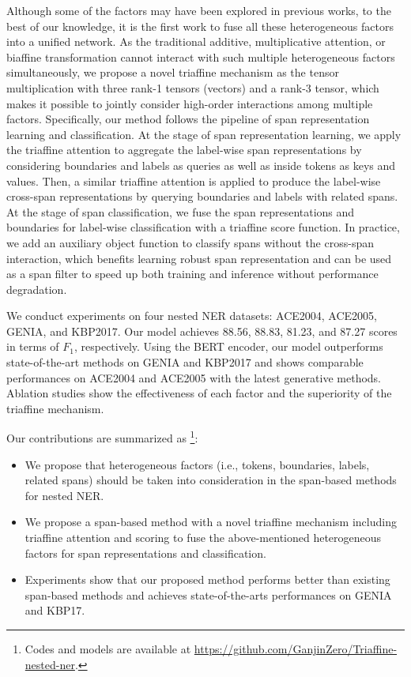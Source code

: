 \documentclass[11pt]{article}
\begin{document}
Although some of the factors may have been explored in previous works, to the best of our knowledge, it is the first work to fuse all these heterogeneous factors into a unified network. As the traditional additive, multiplicative attention, or biaffine transformation cannot interact with such multiple heterogeneous factors simultaneously, we propose a novel triaffine mechanism as the tensor multiplication with three rank-1 tensors (vectors) and a rank-3 tensor, which makes it possible to jointly consider high-order interactions among multiple factors. Specifically, our method follows the pipeline of span representation learning and classification. At the stage of span representation learning, we apply the triaffine attention to aggregate the label-wise span representations by considering boundaries and labels as queries as well as inside tokens as keys and values. Then, a similar triaffine attention is applied to produce the label-wise cross-span representations by querying boundaries and labels with related spans. At the stage of span classification, we fuse the span representations and boundaries for label-wise classification with a triaffine score function. 
In practice, we add an auxiliary object function to classify spans without the cross-span interaction, which benefits learning robust span representation and can be used as a span filter to speed up both training and inference without performance degradation.

We conduct experiments on four nested NER datasets: ACE2004, ACE2005, GENIA, and KBP2017. 
Our model achieves 88.56, 88.83, 81.23, and 87.27 scores in terms of $F_1$, respectively.
Using the BERT encoder, our model outperforms state-of-the-art methods on GENIA and KBP2017 and shows comparable performances on ACE2004 and ACE2005 with the latest generative methods.
Ablation studies show the effectiveness of each factor and the superiority of the triaffine mechanism. 


Our contributions are summarized as \footnote{Codes and models are available at \url{https://github.com/GanjinZero/Triaffine-nested-ner}.}:
\begin{itemize}
    \item We propose that heterogeneous factors (i.e., tokens, boundaries, labels, related spans) should be taken into consideration in the span-based methods for nested NER.
    \item We propose a span-based method with a novel triaffine mechanism including triaffine attention and scoring to fuse the above-mentioned heterogeneous factors for span representations and classification.
    \item Experiments show that our proposed method performs better than existing span-based methods and achieves state-of-the-arts performances on GENIA and KBP17.
\end{itemize}
\end{document}
